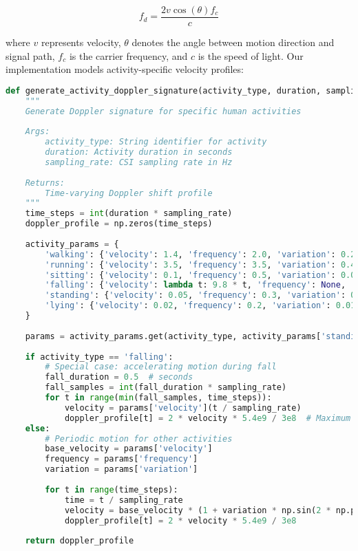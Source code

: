 \documentclass[journal]{IEEEtran}
\begin{document}
\begin{equation}
f_d = \frac{2v \cos(\theta)f_c}{c}
\end{equation}

where $v$ represents velocity, $\theta$ denotes the angle between motion direction and signal path, $f_c$ is the carrier frequency, and $c$ is the speed of light. Our implementation models activity-specific velocity profiles:

\begin{lstlisting}[language=Python, caption=Activity-Specific Doppler Modeling]
def generate_activity_doppler_signature(activity_type, duration, sampling_rate=1000):
    """
    Generate Doppler signature for specific human activities
    
    Args:
        activity_type: String identifier for activity
        duration: Activity duration in seconds
        sampling_rate: CSI sampling rate in Hz
    
    Returns:
        Time-varying Doppler shift profile
    """
    time_steps = int(duration * sampling_rate)
    doppler_profile = np.zeros(time_steps)
    
    activity_params = {
        'walking': {'velocity': 1.4, 'frequency': 2.0, 'variation': 0.2},
        'running': {'velocity': 3.5, 'frequency': 3.5, 'variation': 0.4},
        'sitting': {'velocity': 0.1, 'frequency': 0.5, 'variation': 0.05},
        'falling': {'velocity': lambda t: 9.8 * t, 'frequency': None, 'variation': 0.1},
        'standing': {'velocity': 0.05, 'frequency': 0.3, 'variation': 0.02},
        'lying': {'velocity': 0.02, 'frequency': 0.2, 'variation': 0.01}
    }
    
    params = activity_params.get(activity_type, activity_params['standing'])
    
    if activity_type == 'falling':
        # Special case: accelerating motion during fall
        fall_duration = 0.5  # seconds
        fall_samples = int(fall_duration * sampling_rate)
        for t in range(min(fall_samples, time_steps)):
            velocity = params['velocity'](t / sampling_rate)
            doppler_profile[t] = 2 * velocity * 5.4e9 / 3e8  # Maximum Doppler shift
    else:
        # Periodic motion for other activities
        base_velocity = params['velocity']
        frequency = params['frequency']
        variation = params['variation']
        
        for t in range(time_steps):
            time = t / sampling_rate
            velocity = base_velocity * (1 + variation * np.sin(2 * np.pi * frequency * time))
            doppler_profile[t] = 2 * velocity * 5.4e9 / 3e8
    
    return doppler_profile
\end{lstlisting}
\end{document}

